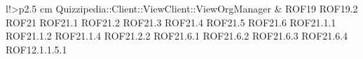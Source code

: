 \begin{tabella}{l!{\VRule}>{\centering\arraybackslash}p{2.5 cm}}
Quizzipedia::Client::ViewClient::ViewOrgManager & ROF19 \linebreak ROF19.2 \linebreak ROF21 \linebreak ROF21.1 \linebreak ROF21.2 \linebreak ROF21.3 \linebreak ROF21.4 \linebreak ROF21.5 \linebreak ROF21.6 \linebreak ROF21.1.1 \linebreak ROF21.1.2 \linebreak ROF21.1.4 \linebreak ROF21.2.2 \linebreak ROF21.6.1 \linebreak ROF21.6.2 \linebreak ROF21.6.3 \linebreak ROF21.6.4 \linebreak ROF12.1.1.5.1 \\

\end{tabella}
